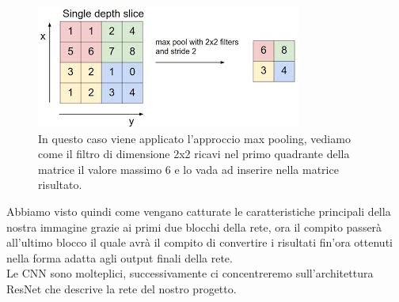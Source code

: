 \begin{figure}[H]
  \begin{center}
    \includegraphics[width=0.8\columnwidth]{images/pooling.jpg}
  \end{center}
  \caption{In questo caso viene applicato l'approccio max pooling, vediamo come il filtro di dimensione 2x2 ricavi nel primo quadrante della matrice il valore massimo 6 e lo vada ad inserire nella matrice risultato.}
  \label{fig:Pooling}
\end{figure}
Abbiamo visto quindi come vengano catturate le caratteristiche principali della nostra immagine grazie ai primi due blocchi della rete, ora il compito passerà all'ultimo blocco il quale avrà il compito di convertire i risultati fin'ora ottenuti nella forma adatta agli output finali della rete.
\\Le CNN sono molteplici, successivamente ci concentreremo sull'architettura ResNet che descrive la rete del nostro progetto.


